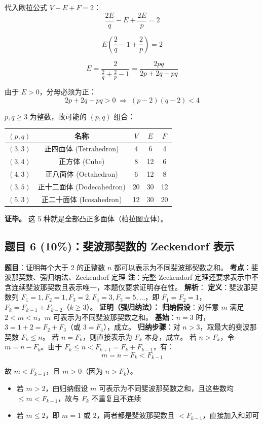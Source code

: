 \documentclass[10pt,a4paper,openany]{ctexbook}
\theoremstyle{definition}
\theoremstyle{remark}
\begin{document}
代入欧拉公式 $V - E + F = 2$：
\[
 \frac{2E}{q} - E + \frac{2E}{p} = 2 
\]

\[
 E\left(\frac{2}{q} - 1 + \frac{2}{p}\right) = 2 
\]

\[
 E = \frac{2}{\frac{2}{q} + \frac{2}{p} - 1} = \frac{2pq}{2p + 2q - pq} 
\]

由于 $E > 0$，分母必须为正：
\[
 2p + 2q - pq > 0 \;\Rightarrow\; (p-2)(q-2) < 4 
\]

$p,q \ge 3$ 为整数，故可能的 $(p,q)$ 组合：
\begin{center}
\begin{tabular}{ccccc}
\hline
$(p,q)$ & 名称 & $V$ & $E$ & $F$ \\ \hline
$(3,3)$ & 正四面体 (Tetrahedron) & 4 & 6 & 4 \\
$(3,4)$ & 正方体 (Cube) & 8 & 12 & 6 \\
$(4,3)$ & 正八面体 (Octahedron) & 6 & 12 & 8 \\
$(3,5)$ & 正十二面体 (Dodecahedron) & 20 & 30 & 12 \\
$(5,3)$ & 正二十面体 (Icosahedron) & 12 & 30 & 20 \\
\hline
\end{tabular}

\end{center}

\textbf{证毕。} 这 5 种就是全部凸正多面体（柏拉图立体）。
\vspace{-2pt}

\subsection{题目 6 (10\%)：斐波那契数的 Zeckendorf 表示}

\textbf{题目}：证明每个大于 2 的正整数 $n$ 都可以表示为不同斐波那契数之和。
\textbf{考点}：斐波那契数、强归纳法、Zeckendorf 定理
\textbf{注}：完整 Zeckendorf 定理还要求表示中不含连续斐波那契数且表示唯一，本题仅要求证明存在性。
\textbf{解析}：
\textbf{定义}：斐波那契数列 $F_1 = 1, F_2 = 1, F_3 = 2, F_4 = 3, F_5 = 5, \dots$，即 $F_1 = F_2 = 1$，$F_{k} = F_{k-1} + F_{k-2}$（$k \ge 3$）。
\textbf{证明（强归纳法）：}
\textbf{归纳假设}：对任意 $m$ 满足 $2 < m < n$，$m$ 可表示为不同斐波那契数之和。
\textbf{基始}：$n = 3$ 时，$3 = 1 + 2 = F_2 + F_3$（或 $3 = F_4$），成立。
\textbf{归纳步骤}：对 $n > 3$，取最大的斐波那契数 $F_k \le n$。
若 $n = F_k$，则直接表示为 $F_k$ 本身，成立。
若 $n > F_k$，令 $m = n - F_k$。由于 $F_k \le n < F_{k+1} = F_k + F_{k-1}$，有：
\[
 m = n - F_k < F_{k-1} 
\]

故 $m < F_{k-1}$，且 $m > 0$（因为 $n > F_k$）。
\begin{itemize}
\item 若 $m > 2$，由归纳假设 $m$ 可表示为不同斐波那契数之和，且这些数均 $\le m < F_{k-1}$，故与 $F_k$ 不重复且不连续
\item 若 $m \le 2$，即 $m = 1$ 或 $2$，两者都是斐波那契数且 $< F_{k-1}$，直接加入和即可

\end{itemize}
\end{document}
